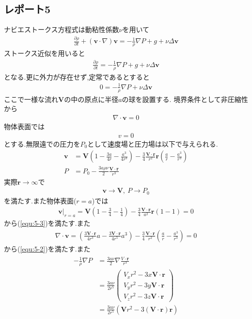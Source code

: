 \documentclass[uplatex,a4j,11pt,dvipdfmx]{jsarticle}
\begin{document}
\subsection*{レポート5}
ナビエストークス方程式は動粘性係数$\nu$を用いて
\begin{align}
  \frac{\partial \rho}{\partial t}+({\bm v}\cdot\nabla){\bm v}=-\frac{1}{\rho}\nabla P+g+\nu\Delta{\bm v}
\end{align}
ストークス近似を用いると
\begin{align}
  \frac{\partial \rho}{\partial t}=-\frac{1}{\rho}\nabla P+g+\nu\Delta{\bm v}
\end{align}
となる.更に外力が存在せず,定常であるとすると
\begin{align}
  \label{equ:5-1}
  0=-\frac{1}{\rho}\nabla P+\nu\Delta{\bm v}
\end{align}
ここで一様な流れ$\bm V$の中の原点に半径$a$の球を設置する.
境界条件として非圧縮性から
\begin{align}
  \label{equ:5-2}
  \nabla\cdot{\bm v}=0
\end{align}
物体表面では
\begin{align}
  \label{equ:5-3}
  v=0
\end{align}
とする.無限遠での圧力を$P_0$として速度場と圧力場は以下で与えられる.
\begin{align}
  {\bm v}&={\bm V}\left(1-\frac{3a}{4r}-\frac{a^3}{4r^3}\right)-\frac{3}{4}\frac{{\bm V}\cdot{\bm r}}{r^2}{\bm r}\left(\frac{a}{r}-\frac{a^3}{r^3}\right)\\
  \label{equ:5P0}
  P&=P_0-\frac{3a\rho\nu}{2}\frac{{\bm V}\cdot{\bm r}}{r^3}
\end{align}
実際${\bm r}\rightarrow\infty$で
\begin{align}
  {\bm v}\rightarrow{\bm V},\ P\rightarrow P_0
\end{align}
を満たす.また物体表面($r=a$)では
\begin{align}
  {\bm v}|_{r=a}={\bm V}\left(1-\frac{3}{4}-\frac{1}{4}\right)-\frac{3}{4}\frac{{\bm V}\cdot{\bm r}}{a^2}{\bm r}\left(1-1\right)=0
\end{align}
から(\ref{equ:5-3})を満たす.また
\begin{align}
  \nabla\cdot{\bm v}=\left(\frac{3{\bm V}\cdot{\bm r}}{4r^3}a-\frac{3{\bm V}\cdot{\bm r}}{4r^5}a^3\right)-\frac{3}{4}\frac{{\bm V}\cdot{\bm r}}{r^2}\left(\frac{a}{r}-\frac{a^3}{r^3}\right)=0
\end{align}
から(\ref{equ:5-2})を満たす.また
\begin{align}
  \begin{split}
    -\frac{1}{\rho}\nabla P&=\frac{3a\nu}{2}\nabla\frac{V\cdot{\bm r}}{r^3}\\
    &=\frac{3a\nu}{2r^5}\left(
      \begin{array}{c}
        V_xr^2-3x{\bm V}\cdot{\bm r}\\
        V_yr^2-3y{\bm V}\cdot{\bm r}\\
        V_zr^2-3z{\bm V}\cdot{\bm r}
      \end{array}
    \right)\\
    &=\frac{3a\nu}{2r^5}\left({\bm V}r^2-3({\bm V}\cdot{\bm r}){\bm r}\right)
  \end{split}
\end{align}
\end{document}
